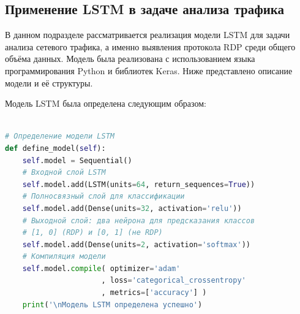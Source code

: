 \documentclass[bachelor, och, coursework]{SCWorks}
\begin{document}
  \subsection{Применение LSTM в задаче анализа трафика}

В данном подразделе рассматривается реализация модели LSTM для задачи анализа сетевого трафика, а именно выявления протокола RDP среди общего объёма 
данных. Модель была реализована с использованием языка программирования Python и библиотек Keras. Ниже представлено описание модели и её структуры.

Модель LSTM была определена следующим образом:

\begin{lstlisting}[language=Python, caption=Определение модели LSTM, xleftmargin=0.75cm, framexleftmargin=0.75cm]

# Определение модели LSTM
def define_model(self):
    self.model = Sequential()
    # Входной слой LSTM
    self.model.add(LSTM(units=64, return_sequences=True))
    # Полносвязный слой для классификации
    self.model.add(Dense(units=32, activation='relu'))
    # Выходной слой: два нейрона для предсказания классов 
    # [1, 0] (RDP) и [0, 1] (не RDP)
    self.model.add(Dense(units=2, activation='softmax'))
    # Компиляция модели
    self.model.compile( optimizer='adam'
                      , loss='categorical_crossentropy'
                      , metrics=['accuracy'] )
    print('\nМодель LSTM определена успешно')
\end{lstlisting}
\end{document}
